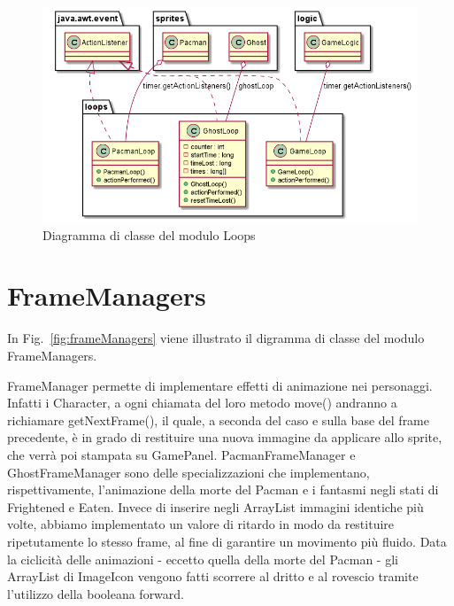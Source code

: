 \documentclass[12pt,a4paper]{report}
\begin{document}
\begin{figure}[tb]
\begin{center}
  \includegraphics[width=15cm]{loops}
\end{center}
  \caption{Diagramma di classe del modulo Loops}
  \label{fig:loops}
\end{figure}


\section{FrameManagers}\label{se:arch.frameManagers}
In Fig.~\ref{fig:frameManagers} viene illustrato il digramma di classe del modulo FrameManagers.\newline

FrameManager permette di implementare effetti di animazione nei personaggi. Infatti i Character, a ogni chiamata del loro metodo move() andranno a richiamare getNextFrame(), il quale, a seconda del caso e sulla base del frame precedente, è in grado di restituire una nuova immagine da applicare allo sprite, che verrà poi stampata su GamePanel. 
PacmanFrameManager  e GhostFrameManager sono delle specializzazioni che implementano, rispettivamente, l’animazione della morte del Pacman e i fantasmi negli stati di Frightened e Eaten. 
Invece di inserire negli ArrayList immagini identiche più volte, abbiamo implementato un valore di ritardo in modo da restituire ripetutamente lo stesso frame, al fine di garantire un movimento più fluido. 
Data la ciclicità delle animazioni - eccetto quella della morte del Pacman - gli ArrayList di ImageIcon vengono fatti scorrere al dritto e al rovescio tramite l’utilizzo della booleana forward.
\end{document}
